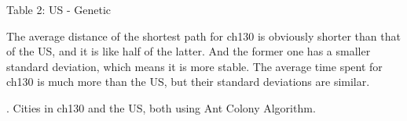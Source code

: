 \documentclass{article}
\begin{document}
\begin{center}


\begin{center}
    Table 2: US - Genetic
\end{center}

\end{center}

The average distance of the shortest path for ch130 is obviously shorter than that of the US, and it is like half of the latter. And the former one has a smaller standard deviation, which means it is more stable. The average time spent for ch130 is much more than the US, but their standard deviations are similar.

. Cities in ch130 and the US, both using Ant Colony Algorithm.
\end{document}
